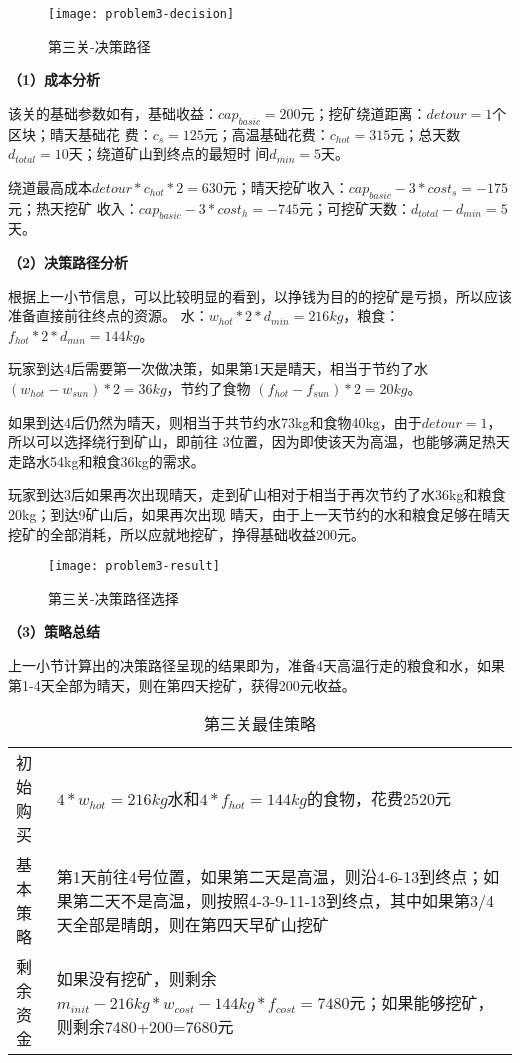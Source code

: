 \documentclass[withoutpreface,bwprint]{cumcmthesis} %
\begin{document}
\begin{figure}[!h]
    \centering
    \texttt{[image: problem3-decision]}
    \caption{第三关-决策路径}
    \label{fig:problem3-decision}
\end{figure}

\textbf{（1）成本分析}

该关的基础参数如有，基础收益：$cap_{basic} = 200$元；挖矿绕道距离：$detour = 1$个区块；晴天基础花
费：$c_s=125$元；高温基础花费：$c_{hot}=315$元；总天数$d_{total}=10$天；绕道矿山到终点的最短时
间$d_{min}=5$天。

绕道最高成本$detour*c_{hot}*2=630$元；晴天挖矿收入：$cap_{basic}-3*cost_s=-175$元；热天挖矿
收入：$cap_{basic}-3*cost_h=-745$元；可挖矿天数：$d_{total}-d_{min}=5$天。

\textbf{（2）决策路径分析}

根据上一小节信息，可以比较明显的看到，以挣钱为目的的挖矿是亏损，所以应该准备直接前往终点的资源。
水：$w_{hot}*2*d_{min}=216kg$，粮食：$f_{hot}*2*d_{min}=144kg$。

玩家到达4后需要第一次做决策，如果第1天是晴天，相当于节约了水$(w_{hot}-w_{sun})*2=36kg$，节约了食物
$(f_{hot}-f_{sun})*2=20kg$。

如果到达4后仍然为晴天，则相当于共节约水73kg和食物40kg，由于$detour=1$，所以可以选择绕行到矿山，即前往
3位置，因为即使该天为高温，也能够满足热天走路水54kg和粮食36kg的需求。

玩家到达3后如果再次出现晴天，走到矿山相对于相当于再次节约了水36kg和粮食20kg；到达9矿山后，如果再次出现
晴天，由于上一天节约的水和粮食足够在晴天挖矿的全部消耗，所以应就地挖矿，挣得基础收益200元。

\begin{figure}[!h]
    \centering
    \texttt{[image: problem3-result]}
    \caption{第三关-决策路径选择}
    \label{fig:problem3-result}
\end{figure}

\textbf{（3）策略总结}

上一小节计算出的决策路径呈现的结果即为，准备4天高温行走的粮食和水，如果第1-4天全部为晴天，则在第四天挖矿，获得200元收益。

\begin{table}[!htbp]
    \caption{第三关最佳策略}\label{tab:strategy} \centering
    \begin{tabular}{p{2cm}p{13cm}}
        \midrule[1pt]
        初始购买 & $4*w_{hot}=216kg$水和$4*f_{hot}=144kg$的食物，花费2520元 \\
        基本策略 & 第1天前往4号位置，如果第二天是高温，则沿4-6-13到终点；如果第二天不是高温，则按照4-3-9-11-13到终点，其中如果第3/4天全部是晴朗，则在第四天早矿山挖矿 \\
        剩余资金 & 如果没有挖矿，则剩余$m_{init}-216kg*w_{cost}-144kg*f_{cost}=7480$元；如果能够挖矿，则剩余7480+200=7680元 \\
        \bottomrule[1pt]
    \end{tabular}
\end{table}
\end{document}
